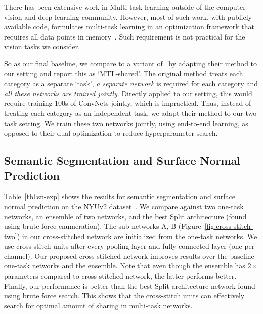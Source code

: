 \documentclass[10pt,twocolumn,letterpaper]{article}
\begin{document}
There has been extensive work in Multi-task learning outside of the computer vision and deep learning community. However, most of such work, with publicly available code, formulates multi-task learning in an optimization framework that requires all data points in memory~\cite{zhou2012mutal,chen2011integrating,gu2009learning,zhou2012modeling,evgeniou2004regularized,lapin2014cvpr,su2015multi}. Such requirement is not practical for the vision tasks we consider.

So as our final baseline, we compare to a variant of~\cite{zhou2013learning,abdulnabi2015multi} by adapting their method to our setting and report this as `MTL-shared'. The original method treats each category as a separate `task', \emph{a separate network} is required for each category and \emph{all these networks are trained jointly}. Directly applied to our setting, this would require training 100s of ConvNets jointly, which is impractical. 
Thus, instead of treating each category as an independent task, we adapt their method to our two-task setting. We train these two networks jointly, using end-to-end learning, as opposed to their dual optimization to reduce hyperparameter search.

\subsection{Semantic Segmentation and Surface Normal Prediction}
Table~\ref{tbl:sn-exp} shows the results for semantic segmentation and surface normal prediction on the NYUv2 dataset~\cite{nyuv2}. We compare against two one-task networks, an ensemble of two networks, and the best Split architecture (found using brute force enumeration). The sub-networks $\mathrm{A}$, $\mathrm{B}$ (Figure~\ref{fig:cross-stitch-two}) in our cross-stitched network are initialized from the one-task networks. We use cross-stitch units after every pooling layer and fully connected layer (one per channel). Our proposed cross-stitched network improves results over the baseline one-task networks and the ensemble. Note that even though the ensemble has $2\times$ parameters compared to cross-stitched network, the latter performs better. Finally, our performance is better than the best Split architecture network found using brute force search. This shows that the cross-stitch units can effectively search for optimal amount of sharing in multi-task networks.
\end{document}
